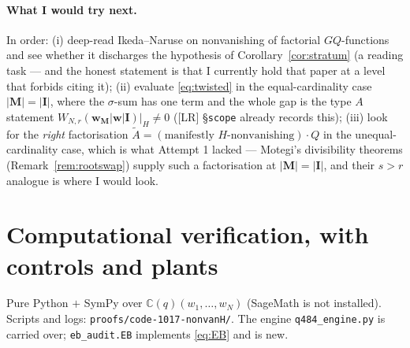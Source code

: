 \documentclass[11pt]{article}
\theoremstyle{plain}
\theoremstyle{definition}
\theoremstyle{remark}
\theoremstyle{plain}
\newcommand{\bI}{\mathbf{I}}
\newcommand{\bM}{\mathbf{M}}
\newcommand{\bw}{\mathbf{w}}
\newcommand{\At}{\widetilde{A}}
\begin{document}
\paragraph{What I would try next.}
In order: (i) deep-read Ikeda--Naruse on nonvanishing of factorial $GQ$-functions
and see whether it discharges the hypothesis of
Corollary~\ref{cor:stratum} (a reading task --- and the honest statement is that
I currently hold that paper at a level that forbids citing it);
(ii) evaluate \eqref{eq:twisted} in the equal-cardinality case $|\bM|=|\bI|$,
where the $\sigma$-sum has one term and the whole gap is the type $A$ statement
$W_{N,r}(\bw_{\bM}|\bw|\bI)|_H\ne0$ ([LR] \S\texttt{scope} already records
this); (iii) look for the \emph{right} factorisation
$\At=(\text{manifestly }H\text{-nonvanishing})\cdot Q$ in the unequal-cardinality
case, which is what Attempt 1 lacked --- Motegi's divisibility theorems
(Remark~\ref{rem:rootswap}) supply such a factorisation at $|\bM|=|\bI|$, and
their $s>r$ analogue is where I would look.

\section{Computational verification, with controls and plants}
\label{sec:verif}

Pure Python $+$ SymPy over $\mathbb{C}(q)(w_1,\dots,w_N)$ (SageMath is not
installed).  Scripts and logs: \texttt{proofs/code-1017-nonvanH/}.  The engine
\texttt{q484\_engine.py} is carried over; \texttt{eb\_audit.EB} implements
\eqref{eq:EB} and is new.
\end{document}
